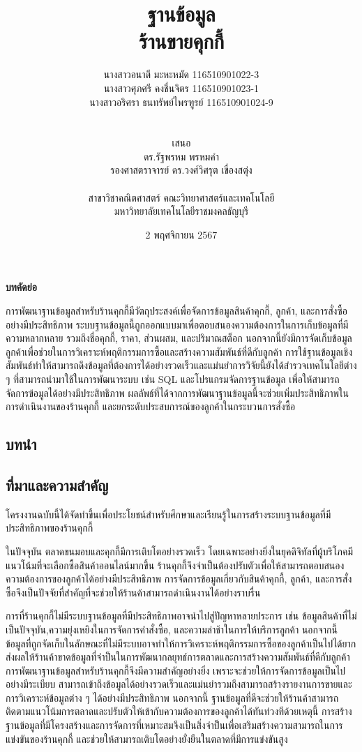 \documentclass{report}
\title{ฐานข้อมูล\\ร้านขายคุกกี้}
\author{    
\begin{tabular}{ll}
	นางสาวอนาตี มะหะหมัด 116510901022-3\\นางสาวศุภศรี คงชื่นจิตร 116510901023-1\\นางสาวอริศรา ธนทรัพย์ไพรฑูรย์ 116510901024-9
\end{tabular}\\ 
\\
เสนอ\\
ดร.รัฐพรหม พรหมคำ\\
รองศาสตราจารย์ ดร.วงศ์วิศรุต เขื่องสตุ่ง\\
\\
สาขาวิชาคณิตศาสตร์ คณะวิทยาศาสตร์และเทคโนโลยี\\
มหาวิทยาลัยเทคโนโลยีราชมงคลธัญบุรี
}
\date{2 พฤศจิกายน 2567}
\begin{document}
\maketitle
\tableofcontents
\listoffigures

\pagebreak

\begin{center}
\textbf{บทคัดย่อ } 
\end{center}
การพัฒนาฐานข้อมูลสําหรับร้านคุกกี้มีวัตถุประสงค์เพื่อจัดการข้อมูลสินค้าคุกกี้, ลูกค้า, และการสั่งซื้ออย่างมีประสิทธิภาพ ระบบฐานข้อมูลนี้ถูกออกแบบมาเพื่อตอบสนองความต้องการในการเก็บข้อมูลที่มีความหลากหลาย รวมถึงชื่อคุกกี้, ราคา, ส่วนผสม, และปริมาณสต็อก นอกจากนี้ยังมีการจัดเก็บข้อมูลลูกค้าเพื่อช่วยในการวิเคราะห์พฤติกรรมการซื้อและสร้างความสัมพันธ์ที่ดีกับลูกค้า การใช้ฐานข้อมูลเชิงสัมพันธ์ทําให้สามารถดึงข้อมูลที่ต้องการได้อย่างรวดเร็วและแม่นยําการวิจัยนี้ยังได้สํารวจเทคโนโลยีต่าง ๆ ที่สามารถนำมาใช้ในการพัฒนาระบบ เช่น SQL และโปรแกรมจัดการฐานข้อมูล เพื่อให้สามารถจัดการข้อมูลได้อย่างมีประสิทธิภาพ ผลลัพธ์ที่ได้จากการพัฒนาฐานข้อมูลนี้จะช่วยเพิ่มประสิทธิภาพในการดําเนินงานของร้านคุกกี้ และยกระดับประสบการณ์ของลูกค้าในกระบวนการสั่งซื้อ

\begin{center}
\chapter{บทนำ}
\end{center}
\section{ที่มาและความสำคัญ}
โครงงานฉบับนี้ได้จัดทําขึ้นเพื่อประโยชน์สําหรับศึกษาและเรียนรู้ในการสร้างระบบฐานข้อมูลที่มีประสิทธิภาพของร้านคุกกี้ \par

ในปัจจุบัน ตลาดขนมอบและคุกกี้มีการเติบโตอย่างรวดเร็ว โดยเฉพาะอย่างยิ่งในยุคดิจิทัลที่ผู้บริโภคมีแนวโน้มที่จะเลือกซื้อสินค้าออนไลน์มากขึ้น ร้านคุกกี้จึงจําเป็นต้องปรับตัวเพื่อให้สามารถตอบสนองความต้องการของลูกค้าได้อย่างมีประสิทธิภาพ การจัดการข้อมูลเกี่ยวกับสินค้าคุกกี้, ลูกค้า, และการสั่งซื้อจึงเป็นปัจจัยที่สําคัญที่จะช่วยให้ร้านค้าสามารถดําเนินงานได้อย่างราบรื่น

การที่ร้านคุกกี้ไม่มีระบบฐานข้อมูลที่มีประสิทธิภาพอาจนําไปสู่ปัญหาหลายประการ เช่น ข้อมูลสินค้าที่ไม่เป็นปัจจุบัน,ความยุ่งเหยิงในการจัดการคำสั่งซื้อ, และความล่าช้าในการให้บริการลูกค้า นอกจากนี้ ข้อมูลที่ถูกจัดเก็บในลักษณะที่ไม่มีระบบอาจทําให้การวิเคราะห์พฤติกรรมการซื้อของลูกค้าเป็นไปได้ยาก ส่งผลให้ร้านค้าขาดข้อมูลที่จําป็นในการพัฒนากลยุทธ์การตลาดและการสร้างความสัมพันธ์ที่ดีกับลูกค้า
การพัฒนาฐานข้อมูลสำหรับร้านคุกกี้จึงมีความสำคัญอย่างยิ่ง เพราะจะช่วยให้การจัดการข้อมูลเป็นไปอย่างมีระเบียบ สามารถเข้าถึงข้อมูลได้อย่างรวดเร็วและแม่นยํารวมถึงสามารถสร้างรายงานการขายและการวิเคราะห์ข้อมูลต่าง ๆ ได้อย่างมีประสิทธิภาพ นอกจากนี้ ฐานข้อมูลที่ดีจะช่วยให้ร้านค้าสามารถติดตามแนวโน้มการตลาดและปรับตัวให้เข้ากับความต้องการของลูกค้าได้ทันท่วงทีด้วยเหตุนี้ การสร้างฐานข้อมูลที่มีโครงสร้างและการจัดการที่เหมาะสมจึงเป็นสิ่งจําป็นเพื่อเสริมสร้างความสามารถในการแข่งขันของร้านคุกกี้ และช่วยให้สามารถเติบโตอย่างยั่งยืนในตลาดที่มีการแข่งขันสูง\par
\end{document}

